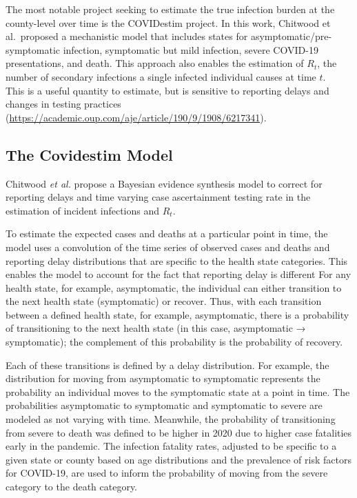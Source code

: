 \documentclass[12pt,twoside]{smiththesis}
\begin{document}
The most notable project seeking to estimate the true infection burden at the county-level over time is the COVIDestim project. In this work, Chitwood et al.~proposed a mechanistic model that includes states for asymptomatic/pre-symptomatic infection, symptomatic but mild infection, severe COVID-19 presentations, and death. This approach also enables the estimation of \(R_t\), the number of secondary infections a single infected individual causes at time \(t\).\\
This is a useful quantity to estimate, but is sensitive to reporting delays and changes in testing practices (\url{https://academic.oup.com/aje/article/190/9/1908/6217341}).

\hypertarget{the-covidestim-model}{%
\subsection{The Covidestim Model}\label{the-covidestim-model}}

Chitwood \emph{et al.} propose a Bayesian evidence synthesis model to correct for reporting delays and time varying case ascertainment testing rate in the estimation of incident infections and \(R_t\).

To estimate the expected cases and deaths at a particular point in time, the model uses a convolution of the time series of observed cases and deaths and reporting delay distributions that are specific to the health state categories. This enables the model to account for the fact that reporting delay is different For any health state, for example, asymptomatic, the individual can either transition to the next health state (symptomatic) or recover. Thus, with each transition between a defined health state, for example, asymptomatic, there is a probability of transitioning to the next health state (in this case, asymptomatic → symptomatic); the complement of this probability is the probability of recovery.

Each of these transitions is defined by a delay distribution. For example, the distribution for moving from asymptomatic to symptomatic represents the probability an individual moves to the symptomatic state at a point in time. The probabilities asymptomatic to symptomatic and symptomatic to severe are modeled as not varying with time. Meanwhile, the probability of transitioning from severe to death was defined to be higher in 2020 due to higher case fatalities early in the pandemic. The infection fatality rates, adjusted to be specific to a given state or county based on age distributions and the prevalence of risk factors for COVID-19, are used to inform the probability of moving from the severe category to the death category.
\end{document}

